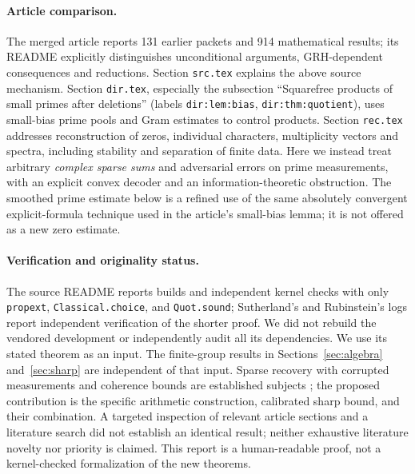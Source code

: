 \documentclass[11pt]{article}
\theoremstyle{remark}\newtheorem{remark}[theorem]{Remark}
\newcommand{\code}[1]{\texttt{#1}}
\begin{document}
\paragraph{Article comparison.} The merged article \cite{article} reports 131 earlier packets and 914 mathematical results; its README explicitly distinguishes unconditional arguments, GRH-dependent consequences and reductions. Section \code{src.tex} explains the above source mechanism. Section \code{dir.tex}, especially the subsection ``Squarefree products of small primes after deletions'' (labels \code{dir:lem:bias}, \code{dir:thm:quotient}), uses small-bias prime pools and Gram estimates to control products. Section \code{rec.tex} addresses reconstruction of zeros, individual characters, multiplicity vectors and spectra, including stability and separation of finite data. Here we instead treat arbitrary \emph{complex sparse sums} and adversarial errors on prime measurements, with an explicit convex decoder and an information-theoretic obstruction. The smoothed prime estimate below is a refined use of the same absolutely convergent explicit-formula technique used in the article's small-bias lemma; it is not offered as a new zero estimate.

\paragraph{Verification and originality status.} The source README reports builds and independent kernel checks with only \code{propext}, \code{Classical.choice}, and \code{Quot.sound}; Sutherland's and Rubinstein's logs \cite{suth,rubin} report independent verification of the shorter proof. We did not rebuild the vendored development or independently audit all its dependencies. We use its stated theorem as an input. The finite-group results in Sections~\ref{sec:algebra} and~\ref{sec:sharp} are independent of that input. Sparse recovery with corrupted measurements and coherence bounds are established subjects \cite{studer}; the proposed contribution is the specific arithmetic construction, calibrated sharp bound, and their combination. A targeted inspection of relevant article sections and a literature search did not establish an identical result; neither exhaustive literature novelty nor priority is claimed. This report is a human-readable proof, not a kernel-checked formalization of the new theorems.
\end{document}
